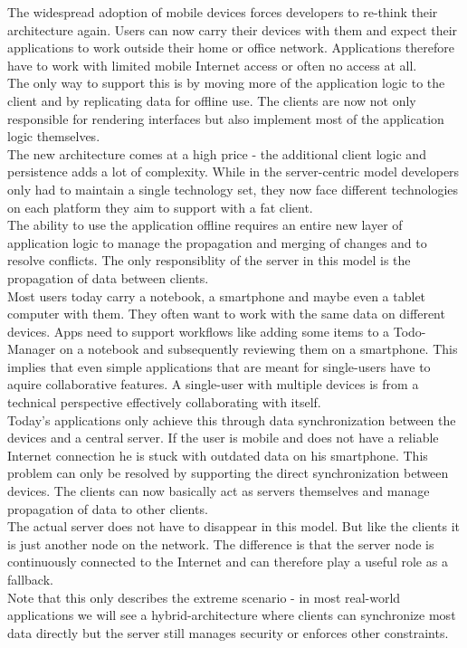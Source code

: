 The widespread adoption of mobile devices forces developers to re-think their architecture again.
Users can now carry their devices with them and expect their applications to work outside their home or office network.
Applications therefore have to work with limited mobile Internet access or often no access at all.\\
The only way to support this is by moving more of the application logic to the client and by replicating data for offline use.
The clients are now not only responsible for rendering interfaces but also implement most of the application logic themselves.\\
The new architecture comes at a high price - the additional client logic and persistence adds a lot of complexity.
While in the server-centric model developers only had to maintain a single technology set, they now face different technologies on each platform they aim to support with a fat client.\\
The ability to use the application offline requires an entire new layer of application logic to manage the propagation and merging of changes and to resolve conflicts.
The only responsiblity of the server in this model is the propagation of data between clients.\\

Most users today carry a notebook, a smartphone and maybe even a tablet computer with them.
They often want to work with the same data on different devices.
Apps need to support workflows like adding some items to a Todo-Manager on a notebook and subsequently reviewing them on a smartphone.
This implies that even simple applications that are meant for single-users have to aquire collaborative features.
A single-user with multiple devices is from a technical perspective effectively collaborating with itself.\\
Today's applications only achieve this through data synchronization between the devices and a central server.
If the user is mobile and does not have a reliable Internet connection he is stuck with outdated data on his smartphone.
This problem can only be resolved by supporting the direct synchronization between devices.
The clients can now basically act as servers themselves and manage propagation of data to other clients.\\
The actual server does not have to disappear in this model.
But like the clients it is just another node on the network.
The difference is that the server node is continuously connected to the Internet and can therefore play a useful role as a fallback.\\
Note that this only describes the extreme scenario - in most real-world applications we will see a hybrid-architecture where clients can synchronize most data directly but the server still manages security or enforces other constraints.\\

